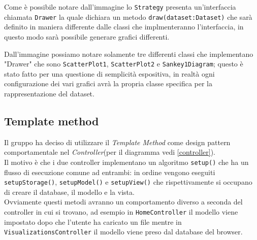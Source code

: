 Come è possibile notare dall'immagine lo \texttt{Strategy} presenta un'interfaccia chiamata \texttt{Drawer} la quale dichiara un metodo \texttt{draw(dataset:Dataset)} che sarà definito in maniera differente dalle classi che implmenteranno l'interfaccia, in questo modo sarà possibile generare grafici differenti.

Dall'immagine possiamo notare solamente tre differenti classi che implementano "Drawer" che sono \texttt{ScatterPlot1}, \texttt{ScatterPlot2} e \texttt{Sankey1Diagram}; questo è stato fatto per una questione di semplicità espositiva, in realtà ogni configurazione dei vari grafici avrà la propria classe specifica per la rappresentazione del dataset. \\

\subsection{Template method}
Il gruppo ha deciso di utilizzare il \textit{Template Method} come design pattern comportamentale nel \textit{Controller}(per il diagramma vedi \ref{controller}). \\Il motivo è che i due controller implementano un algoritmo \texttt{setup()} che ha un flusso di esecuzione comune ad entrambi: in ordine vengono eseguiti \texttt{setupStorage()}, \texttt{setupModel()} e \texttt{setupView()} che rispettivamente si occupano di creare il database, il modello e la vista. \\Ovviamente questi metodi avranno un comportamento diverso a seconda del controller in cui si trovano, ad esempio in \texttt{HomeController} il modello viene impostato dopo che l'utente ha caricato un file mentre in \texttt{VisualizationsController} il modello viene preso dal database del browser.
